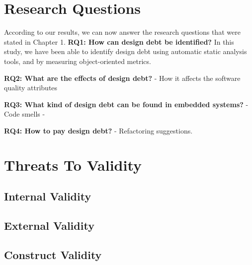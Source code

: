 \section{Research Questions}
According to our results, we can now answer the research questions that were stated in Chapter 1.
\textbf{RQ1: How can design debt be identified?}
In this study, we have been able to identify design debt using automatic static analysis tools, and by measuring object-oriented metrics.


\textbf{RQ2: What are the effects of design debt?}
- How it affects the software quality attributes

\textbf{RQ3: What kind of design debt can be found in embedded systems?}
- Code smells
- 

\textbf{RQ4: How to pay design debt?}
- Refactoring suggestions.






\section{Threats To Validity}
\label{sub:threats_to_validity}

\subsection{Internal Validity}
\label{sub:internal_validty}

\subsection{External Validity}
\label{sub:external_validity}

\subsection{Construct Validity} %
\label{sub:construct_validity}








